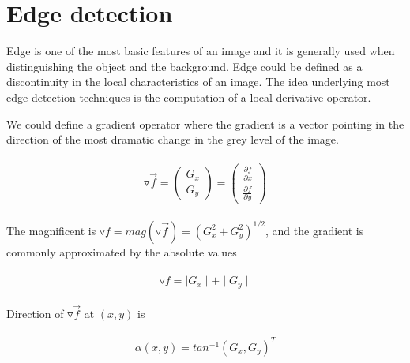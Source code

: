 \documentclass[hyperref]{article}
\theoremstyle{nonumberplain}
\begin{document}
	
	
	\section{Edge detection}
	
	\hspace{1.0em}
	Edge is one of the most basic features of an image and it is generally used when distinguishing the object and the background. Edge could be defined as a discontinuity in the local characteristics of an image. The idea underlying most edge-detection techniques is the computation of a local derivative operator.
	
	We could define a gradient operator where the gradient is a vector pointing in the direction of the most dramatic change in the grey level of the image.
	
	\begin{equation}
	\begin{split}
	\begin{aligned}
	\triangledown \vec{f}=\begin{pmatrix}
	G_{x}\\ 
	G_{y}
	\end{pmatrix}=
	\begin{pmatrix}
	\frac{\partial f}{\partial x}\\ 
	\frac{\partial f}{\partial y}
	\end{pmatrix}
	\end{aligned}
	\end{split}
	\label{eq11}
	\end{equation}
	
	The magnificent is $\triangledown f=mag(\triangledown \vec{f})=(G_{x}^{2}+G_{y}^{2})^{1/2}$, and the gradient is commonly approximated by the absolute values
	
	\begin{equation}
	\begin{split}
	\begin{aligned}
	\triangledown f=\mid G_{x}\mid + \mid G_{y}\mid
	\end{aligned}
	\end{split}
	\label{eq12}
	\end{equation}
	
	Direction of $\triangledown \vec{f}$ at $(x,y)$ is 
	
	\begin{equation}
	\begin{split}
	\begin{aligned}
	\alpha (x,y)=tan^{-1}(G_{x}, G_{y})^{T}
	\end{aligned}
	\end{split}
	\label{eq13}
	\end{equation}
	
\end{document}
